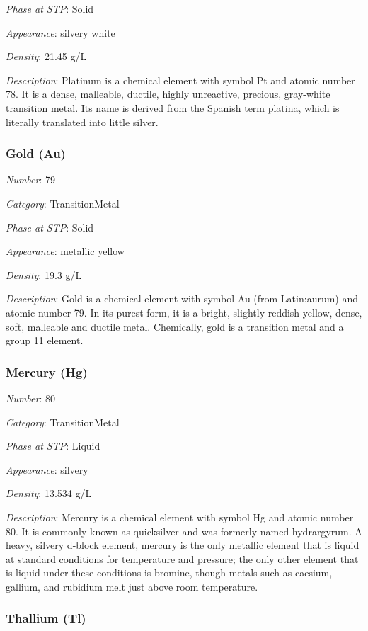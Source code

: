 \documentclass{article}
\begin{document}
\textit{Phase at STP}: Solid

\textit{Appearance}: silvery white

\textit{Density}: 21.45 g/L

\textit{Description}: Platinum is a chemical element with symbol Pt and atomic number 78. It is a dense, malleable, ductile, highly unreactive, precious, gray-white transition metal. Its name is derived from the Spanish term platina, which is literally translated into little silver.

\hypertarget{subsubsection::Au}{}\subsubsection{Gold (Au)}

\textit{Number}: 79

\textit{Category}: TransitionMetal

\textit{Phase at STP}: Solid

\textit{Appearance}: metallic yellow

\textit{Density}: 19.3 g/L

\textit{Description}: Gold is a chemical element with symbol Au (from Latin:aurum) and atomic number 79. In its purest form, it is a bright, slightly reddish yellow, dense, soft, malleable and ductile metal. Chemically, gold is a transition metal and a group 11 element.

\hypertarget{subsubsection::Hg}{}\subsubsection{Mercury (Hg)}

\textit{Number}: 80

\textit{Category}: TransitionMetal

\textit{Phase at STP}: Liquid

\textit{Appearance}: silvery

\textit{Density}: 13.534 g/L

\textit{Description}: Mercury is a chemical element with symbol Hg and atomic number 80. It is commonly known as quicksilver and was formerly named hydrargyrum. A heavy, silvery d-block element, mercury is the only metallic element that is liquid at standard conditions for temperature and pressure; the only other element that is liquid under these conditions is bromine, though metals such as caesium, gallium, and rubidium melt just above room temperature.

\hypertarget{subsubsection::Tl}{}\subsubsection{Thallium (Tl)}
\end{document}
